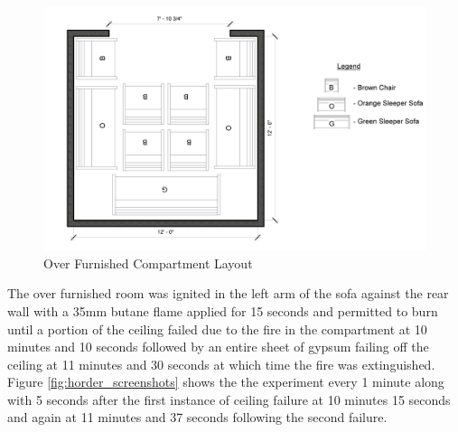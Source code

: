 \documentclass{article}
\begin{document}
\begin{figure}[H]
	\centering
	\includegraphics[width=5in]{0_Images/Vent_Limited_Room/HorderRoom.jpg}
	\caption{Over Furnished Compartment Layout}
	\label{fig:horder_layout}
\end{figure}

The over furnished room was ignited in the left arm of the sofa against the rear wall with a 35mm butane flame applied for 15 seconds and permitted to burn until a portion of the ceiling failed due to the fire in the compartment at 10 minutes and 10 seconds followed by an entire sheet of gypsum failing off the ceiling at 11 minutes and 30 seconds at which time the fire was extinguished. Figure \ref{fig:horder_screenshots} shows the the experiment every 1 minute along with 5 seconds after the first instance of ceiling failure at 10 minutes 15 seconds and again at 11 minutes and 37 seconds following the second failure.
\end{document}
